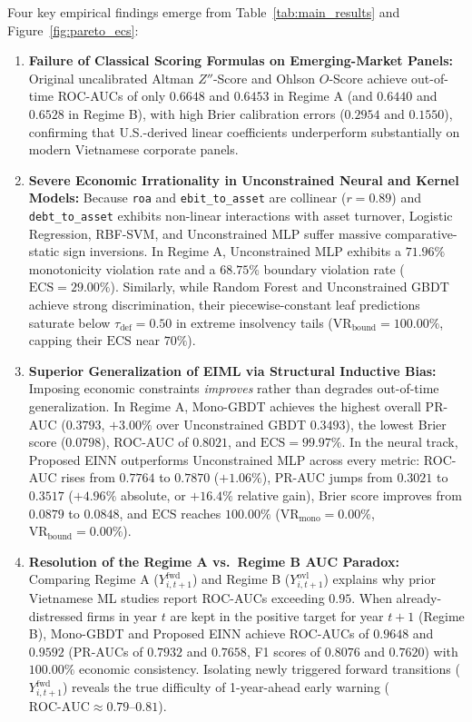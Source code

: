 \documentclass[pdflatex,sn-mathphys-num,twocolumn]{sn-jnl}
\theoremstyle{thmstyleone}
\theoremstyle{thmstyletwo}
\theoremstyle{thmstylethree}
\begin{document}
Four key empirical findings emerge from Table~\ref{tab:main_results} and Figure~\ref{fig:pareto_ecs}:
\begin{enumerate}
    \item \textbf{Failure of Classical Scoring Formulas on Emerging-Market Panels:} Original uncalibrated Altman $Z''$-Score and Ohlson $O$-Score achieve out-of-time ROC-AUCs of only $0.6648$ and $0.6453$ in Regime A (and $0.6440$ and $0.6528$ in Regime B), with high Brier calibration errors ($0.2954$ and $0.1550$), confirming that U.S.-derived linear coefficients underperform substantially on modern Vietnamese corporate panels.
    \item \textbf{Severe Economic Irrationality in Unconstrained Neural and Kernel Models:} Because \texttt{roa} and \texttt{ebit\_to\_asset} are collinear ($r = 0.89$) and \texttt{debt\_to\_asset} exhibits non-linear interactions with asset turnover, Logistic Regression, RBF-SVM, and Unconstrained MLP suffer massive comparative-static sign inversions. In Regime A, Unconstrained MLP exhibits a $71.96\%$ monotonicity violation rate and a $68.75\%$ boundary violation rate ($\text{ECS} = 29.00\%$). Similarly, while Random Forest and Unconstrained GBDT achieve strong discrimination, their piecewise-constant leaf predictions saturate below $\tau_{\text{def}} = 0.50$ in extreme insolvency tails ($\text{VR}_{\text{bound}} = 100.00\%$, capping their $\text{ECS}$ near $70\%$).
    \item \textbf{Superior Generalization of EIML via Structural Inductive Bias:} Imposing economic constraints \textit{improves} rather than degrades out-of-time generalization. In Regime A, Mono-GBDT achieves the highest overall PR-AUC ($0.3793$, $+3.00\%$ over Unconstrained GBDT $0.3493$), the lowest Brier score ($0.0798$), ROC-AUC of $0.8021$, and $\text{ECS} = 99.97\%$. In the neural track, Proposed EINN outperforms Unconstrained MLP across every metric: ROC-AUC rises from $0.7764$ to $0.7870$ ($+1.06\%$), PR-AUC jumps from $0.3021$ to $0.3517$ ($+4.96\%$ absolute, or $+16.4\%$ relative gain), Brier score improves from $0.0879$ to $0.0848$, and $\text{ECS}$ reaches $100.00\%$ ($\text{VR}_{\text{mono}} = 0.00\%$, $\text{VR}_{\text{bound}} = 0.00\%$).
    \item \textbf{Resolution of the Regime A vs.\ Regime B AUC Paradox:} Comparing Regime A ($Y_{i,t+1}^{\text{fwd}}$) and Regime B ($Y_{i,t+1}^{\text{ovl}}$) explains why prior Vietnamese ML studies \citep[e.g.,][]{tran2022explainable} report ROC-AUCs exceeding $0.95$. When already-distressed firms in year $t$ are kept in the positive target for year $t+1$ (Regime B), Mono-GBDT and Proposed EINN achieve ROC-AUCs of $0.9648$ and $0.9592$ (PR-AUCs of $0.7932$ and $0.7658$, F1 scores of $0.8076$ and $0.7620$) with $100.00\%$ economic consistency. Isolating newly triggered forward transitions ($Y_{i,t+1}^{\text{fwd}}$) reveals the true difficulty of 1-year-ahead early warning ($\text{ROC-AUC} \approx 0.79\text{--}0.81$).
\end{enumerate}
\end{document}
